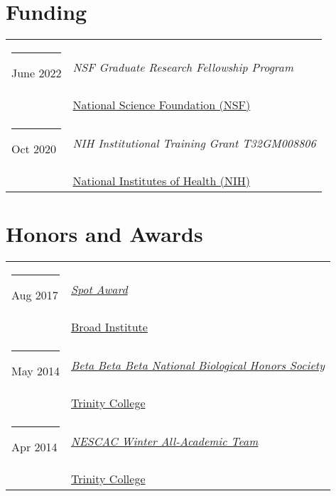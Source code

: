 \documentclass[margin,line]{res}
\begin{document}
\begin{resume}
\section{\sc Funding}
\begin{longtable}{@{}p{0.7in}p{4in}}
    \hspace*{-4mm} \rule{-1mm}{5mm} June 2022 & \textit{NSF Graduate Research Fellowship Program} \\*
    \hspace*{-4mm} \hspace*{-4mm} & \hspace{4mm} \href{https://nih.gov}{National Science Foundation (NSF)}\\
    \hspace*{-4mm} \rule{-1mm}{5mm} Oct 2020 & \textit{NIH Institutional Training Grant T32GM008806} \\*
    \hspace*{-4mm} \hspace*{-4mm} & \hspace{4mm} \href{https://nih.gov}{National Institutes of Health (NIH)}\\
\end{longtable}

\section{\sc Honors and Awards}
\begin{longtable}{@{}p{0.7in}p{4in}}
    \hspace*{-4mm} \rule{-1mm}{5mm} Aug 2017 & \href{}{\textit{Spot Award}}\\*
    \hspace*{-4mm} \hspace*{-4mm} & \hspace{4mm} \href{https://www.broadinstitute.org/}{Broad Institute}\\
    \hspace*{-4mm} \rule{-1mm}{5mm} May 2014 & \href{}{\textit{Beta Beta Beta National Biological Honors Society}}\\*
    \hspace*{-4mm} \hspace*{-4mm} & \hspace{4mm} \href{https://www.trincoll.edu/}{Trinity College}\\
    \hspace*{-4mm} \rule{-1mm}{5mm} Apr 2014 & \href{}{\textit{NESCAC Winter All-Academic Team}}\\*
    \hspace*{-4mm} \hspace*{-4mm} & \hspace{4mm} \href{https://www.trincoll.edu/}{Trinity College}\\
\end{longtable}


\end{resume}
\end{document}
